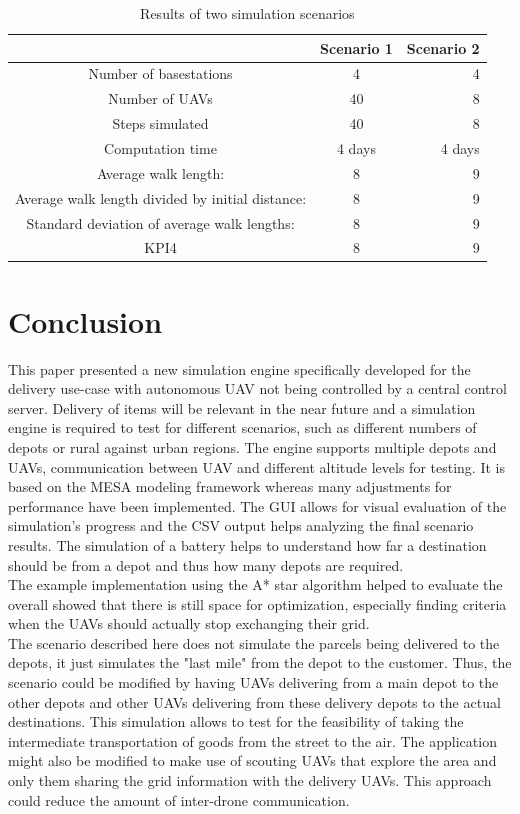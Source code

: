  \begin{table}[tbhp]
 	\centering

  \begin{tabular}{ | c | c | r |}
    \hline
     & Scenario 1 & Scenario 2 \\ \hline
    Number of basestations & 4 & 4 \\ \hline
    Number of UAVs & 40& 8\\ \hline
    Steps simulated & 40& 8\\ \hline
    Computation time & 4 days & 4 days \\ \hline
    Average walk length: & 8 & 9 \\ \hline
    Average walk length divided by initial distance: & 8 & 9 \\ \hline
    Standard deviation of average walk lengths: & 8 & 9 \\ \hline
    KPI4 & 8 & 9 \\ \hline
    \hline
  \end{tabular}
	 	\label{tab:results}
  \caption{Results of two simulation scenarios}
 \end{table}

\section{Conclusion}\label{sec:conclusion}
This paper presented a new simulation engine specifically developed for the delivery use-case with autonomous UAV not being controlled by a central control server. Delivery of items will be relevant in the near future and a simulation engine is required to test for different scenarios, such as different numbers of depots or rural against urban regions. The engine supports multiple depots and UAVs, communication between UAV and different altitude levels for testing. It is based on the MESA modeling framework whereas many adjustments for performance have been implemented. The GUI allows for visual evaluation of the simulation's progress and the CSV output helps analyzing the final scenario results. The simulation of a battery helps to understand how far a destination should be from a depot and thus how many depots are required. \\
The example implementation using the A* star algorithm helped to evaluate the overall showed that there is still space for optimization, especially finding criteria when the UAVs should actually stop exchanging their grid.\\
The scenario described here does not simulate the parcels being delivered to the depots, it just simulates the "last mile" from the depot to the customer. Thus, the scenario could be modified by having UAVs delivering from a main depot to the other depots and other UAVs delivering from these delivery depots to the actual destinations. This simulation allows to test for the feasibility of taking the intermediate transportation of goods from the street to the air. The application might also be modified to make use of scouting UAVs that explore the area and only them sharing the grid information with the delivery UAVs. This approach could reduce the amount of inter-drone communication.

